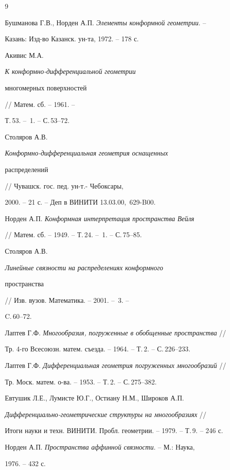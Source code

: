 \begin{thebibliography}{9} 


 




Бушманова Г.В., Норден А.П. {\em Элементы конформной геометрии}. -- 


Казань: Изд-во Казанск. ун-та, 1972. -- 178 с. 




Акивис М.А. {\em К конформно-дифференциальной геометрии 


многомерных поверхностей} // Матем. сб. -- 1961. -- 


Т.\,53. -- \No\,1. -- С.\,53--72. 




Столяров А.В. {\em Конформно-дифференциальная геометрия оснащенных 


распределений} // Чувашск. гос. пед. ун-т.- Чебоксары,


2000. -- 21 с. -- Деп в ВИНИТИ 13.03.00, \No\,629-B00. 




Норден А.П. {\em Конформная интерпретация пространства Вейля} 


// Матем. сб. -- 1949. -- Т.\,24. -- \No\,1. -- С.\,75--85. 




Столяров А.В. {\em Линейные связности на распределениях конформного 


пространства} // Изв. вузов. Математика. -- 2001. -- \No\,3. -- 


C.\,60--72. 




Лаптев Г.Ф. {\em Многообразия, погруженные в обобщенные пространства} // 


Тр. 4-го Всесоюзн. матем. съезда. -- 1964. -- Т.\,2. -- С.\,226--233. 




Лаптев Г.Ф. {\em Дифференциальная геометрия погруженных многообразий} // 


Тр. Моск. матем. о-ва. -- 1953. -- Т.\,2. -- С.\,275--382. 




Евтушик Л.Е., Лумисте Ю.Г., Остиану Н.М., Широков А.П. 


{\em Дифференциально-геометрические структуры на многообразиях} // 


Итоги науки и техн. ВИНИТИ. Пробл. геометрии. -- 1979. -- Т.\,9. -- 246 с. 




Норден А.П. {\em Пространства аффинной связности}. -- М.: Наука, 


1976. -- 432 с. 


 


\end{thebibliography} 


